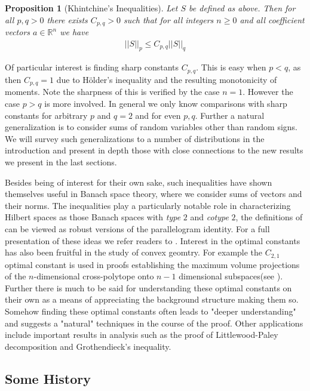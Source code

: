 \documentclass[10pt]{article}
\newcommand{\1}{\textbf{1}}
\newcommand{\R}{\mathbb{R}}
\newcommand{\norm}[1]{\left\lvert\left\lvert#1\right\rvert\right\rvert}
\newtheorem{prop}[theorem]{Proposition}
\theoremstyle{remark}
\theoremstyle{definition}
\begin{document}
\begin{prop}[Khintchine's Inequalities]

	Let $S$ be defined as above. Then for all $p,q > 0$ there exists $C_{p,q} > 0$ such that for all integers $n \geq 0$ and all coefficient vectors $a \in \R^n$ we have
	\begin{align*}
		\norm{S}_p \leq C_{p,q} \norm{S}_q
	\end{align*}
\end{prop}

Of particular interest is finding sharp constants $C_{p,q}$. This is easy when $p < q$, as then $C_{p,q} = 1$ due to H\"older's inequality and the resulting monotonicity of moments. Note the sharpness of this is verified by the case $n=1$. However the case $p > q$ is more involved. In general we only know comparisons with sharp constants for arbitrary $p$ and $q=2$ and for even $p,q$. Further a natural generalization is to consider sums of random variables other than random signs. We will survey such generalizations to a number of distributions in the introduction and present in depth those with close connections to the new results we present in the last sections. 

Besides being of interest for their own sake, such inequalities have shown themselves useful in Banach space theory, where we consider sums of vectors and their norms. The inequalities play a particularly notable role in characterizing Hilbert spaces as those Banach spaces with \textit{type} $2$ and \textit{cotype} $2$, the definitions of can be viewed as robust versions of the parallelogram identity. For a full presentation of these ideas we refer readers to \cite{LT}. Interest in the optimal constants has also been fruitful in the study of convex geomtry. For example the $C_{2,1}$ optimal constant is used in proofs establishing the maximum volume projections of the $n$-dimensional cross-polytope onto $n-1$ dimensional subspaces(see \cite{BN}). Further there is much to be said for understanding these optimal constants on their own as a means of appreciating the background structure making them so. Somehow finding these optimal constants often leads to "deeper understanding" and suggests a "natural" techniques in the course of the proof. Other applications include important results in analysis such as the proof of Littlewood-Paley decomposition and Grothendieck's inequality.

\subsection{Some History}
\end{document}
